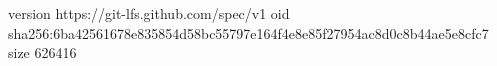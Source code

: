 version https://git-lfs.github.com/spec/v1
oid sha256:6ba42561678e835854d58bc55797e164f4e8e85f27954ac8d0c8b44ae5e8cfc7
size 626416
